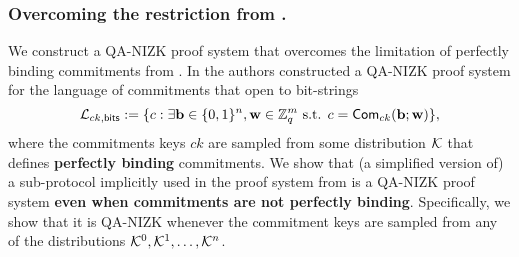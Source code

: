 \subsubsection{Overcoming the restriction from \cite{AC:GonHevRaf15}.}
We construct a QA-NIZK proof system that overcomes the limitation of perfectly binding commitments from \cite{AC:GonHevRaf15}. In \cite{AC:GonHevRaf15} the authors constructed a QA-NIZK proof system for the language of commitments that open to bit-strings
$$
\mathcal{L}_{ck,\mathsf{bits}} :=\{c:\exists \mathbf{b}\in\{0,1\}^n,\mathbf{w}\in\mathbb{Z}_q^m \text{ s.t. } c=\mathsf{Com}_{ck}(\mathbf{b};\mathbf{w})\},
$$
where the commitments keys $ck$ are sampled from some distribution $\mathcal{K}$ that defines \textbf{perfectly binding} commitments. We show that (a simplified version of) a sub-protocol implicitly used in the proof system from \cite{AC:GonHevRaf15} is a QA-NIZK proof system \textbf{even when commitments are not perfectly binding}. Specifically, we show that it is QA-NIZK whenever the commitment keys are sampled from any of the distributions $\mathcal{K}^0,\mathcal{K}^1,\ldots,\mathcal{K}^n$.
%
